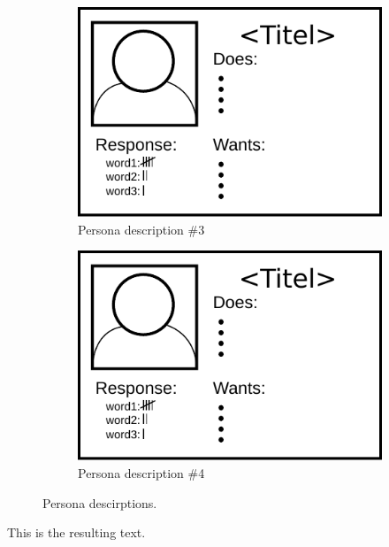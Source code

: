 \begin{figure}[H]
    \begin{subfigure}[b]{0.475\textwidth}
      \includegraphics[width=\textwidth]{images/template_persona.pdf}
      \caption{Persona description \#3}
    \end{subfigure}
    \hfill
    \begin{subfigure}[b]{0.475\textwidth}
      \includegraphics[width=\textwidth]{images/template_persona.pdf}
      \caption{Persona description \#4}
    \end{subfigure}
    \caption{Persona descirptions.}
  \end{figure}
This is the resulting text.
